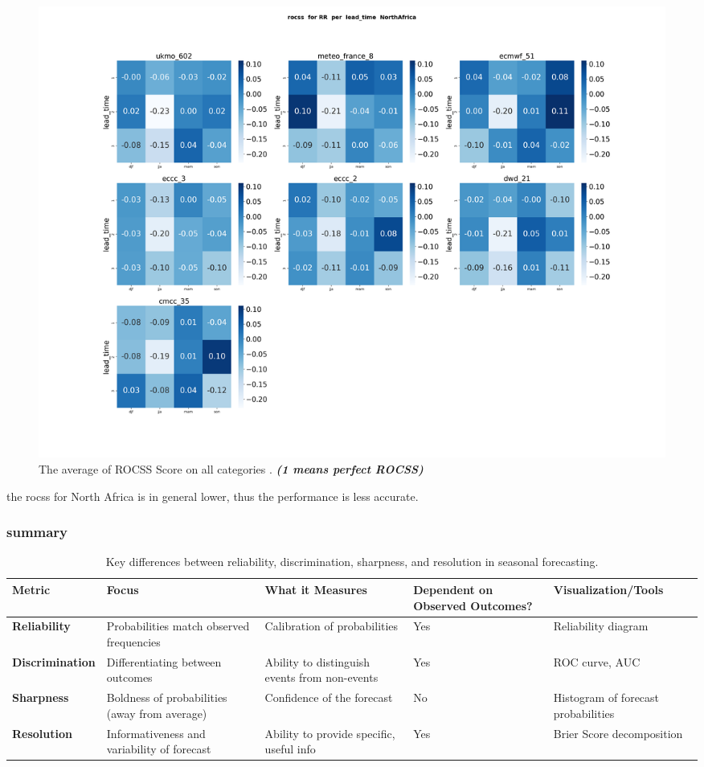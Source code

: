 \begin{figure}[H]
    \centering
    \includegraphics[scale=0.25]{plots/prob/rocss/rocss_RR_lead_time_NorthAfrica.png}
    \caption{The average of  ROCSS Score on all categories    . \textbf{\textit{(1 means perfect ROCSS)}}}
\end{figure}


the rocss for North Africa is in general lower, thus the performance is less accurate.


\subsubsection{summary}
\begin{table}[h!]
\centering
\begin{tabularx}{\textwidth}{@{}p{2.5cm}p{4cm}p{4cm}p{2.5cm}p{3cm}@{}}
\toprule
\textbf{Metric}       & \textbf{Focus}                                    & \textbf{What it Measures}                         & \textbf{Dependent on Observed Outcomes?} & \textbf{Visualization/Tools}             \\ \midrule
\textbf{Reliability}   & Probabilities match observed frequencies          & Calibration of probabilities                      & Yes                                      & Reliability diagram                      \\
\textbf{Discrimination} & Differentiating between outcomes                 & Ability to distinguish events from non-events    & Yes                                      & ROC curve, AUC                           \\
\textbf{Sharpness}     & Boldness of probabilities (away from average)     & Confidence of the forecast                        & No                                       & Histogram of forecast probabilities      \\
\textbf{Resolution}    & Informativeness and variability of forecast       & Ability to provide specific, useful info         & Yes                                      & Brier Score decomposition                \\ \bottomrule
\end{tabularx}
\caption{Key differences between reliability, discrimination, sharpness, and resolution in seasonal forecasting.}
\label{tab:forecast_metrics}
\end{table}

\newpage
\thispagestyle{empty}
\mbox{}

\endinput

